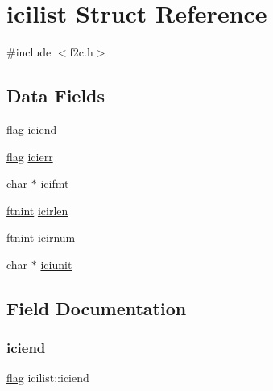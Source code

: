 \hypertarget{structicilist}{}\section{icilist Struct Reference}
\label{structicilist}


{\ttfamily \#include $<$f2c.\+h$>$}

\subsection*{Data Fields}
\begin{DoxyCompactItemize}
\item 
\hyperlink{dependencies_2third-party_2clapack_23_82_81_2_f2_c_l_i_b_s_2libf2c_2f2c_8h_abf5d144da384425ae6cb542ce6eec8d3}{flag} \hyperlink{structicilist_a598f4d4f880c560238c7a32f5dcb3e51}{iciend}
\item 
\hyperlink{dependencies_2third-party_2clapack_23_82_81_2_f2_c_l_i_b_s_2libf2c_2f2c_8h_abf5d144da384425ae6cb542ce6eec8d3}{flag} \hyperlink{structicilist_aee2f6c57bb6df08adfc9d62a185f999a}{icierr}
\item 
char $\ast$ \hyperlink{structicilist_a3cdb7459a29d1dc71e53c0b72d2f9b65}{icifmt}
\item 
\hyperlink{dependencies_2third-party_2clapack_23_82_81_2_f2_c_l_i_b_s_2libf2c_2f2c_8h_a9d70cdb573fb2bf020e1f6dba85fb1cc}{ftnint} \hyperlink{structicilist_ac6025ddf8b1ade5cb73d607dd2d30501}{icirlen}
\item 
\hyperlink{dependencies_2third-party_2clapack_23_82_81_2_f2_c_l_i_b_s_2libf2c_2f2c_8h_a9d70cdb573fb2bf020e1f6dba85fb1cc}{ftnint} \hyperlink{structicilist_a6e4cb8719f1c76ee87273671448da892}{icirnum}
\item 
char $\ast$ \hyperlink{structicilist_aabde2b3e831e973dbcca0e8bd1d8b59b}{iciunit}
\end{DoxyCompactItemize}


\subsection{Field Documentation}
\mbox{\label{structicilist_a598f4d4f880c560238c7a32f5dcb3e51}} 
\subsubsection{\texorpdfstring{iciend}{iciend}}
{\footnotesize\ttfamily \hyperlink{dependencies_2third-party_2clapack_23_82_81_2_f2_c_l_i_b_s_2libf2c_2f2c_8h_abf5d144da384425ae6cb542ce6eec8d3}{flag} icilist\+::iciend}


